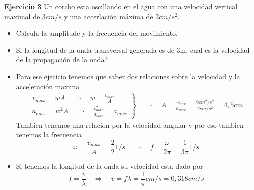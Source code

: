 \begin{ejercicio}
	\textbf{Ejercicio 3} Un corcho esta oscillando en el agua con una velocidad
vertical maximal de $3cm /s$ y una accerlación máxima de $2cm /s^2$. 
	\begin{itemize}
		\item Calcula la amplitude y la frecuencia del movimiento.
		\item Si la longitud de la onda transversal generada es de 3m, cual es
la velocidad de la propagación de la onda?	
	\end{itemize}
\end{ejercicio}
\begin{itemize}
	\item
	Para ese ejecicio tenemos que saber dos relaciones sobre la velocidad y la
acceleración maxima
	\begin{align*}
		\left.
		\begin{aligned}
			v_{max} = w A \quad \Rightarrow \quad w = \frac{v_{max}}{A} \\
			a_{max} = w^2 A  \quad \Rightarrow \quad \frac{v_{max}^2}{a_{max}} =
a_{max}
		\end{aligned}
		\right\rbrace
		\quad \Rightarrow \quad A = \frac{v_{max}^2}{a_{max}} = \frac{9
cm^2/s^2}{2 cm/s^2} = 4,5 cm
	\end{align*}
	Tambien tenemos una relacion por la velocidad angular y por eso tambien
tenemos la frecuencia
	$$
		\omega = \frac{v_{max}}{A} = \frac{2}{2} 1/s \quad \Rightarrow \quad f =
\frac{\omega}{2\pi} = \frac{1}{3 \pi} 1/s
	$$
	
	\item
	Si tenemos la longitud de la onda su velocidad esta dado por
	$$
		f = \frac{v}{\lambda} \quad \Rightarrow \quad v = f \lambda =
\frac{1}{\pi} cm / s = 0,318 cm /s
	$$
\end{itemize}
